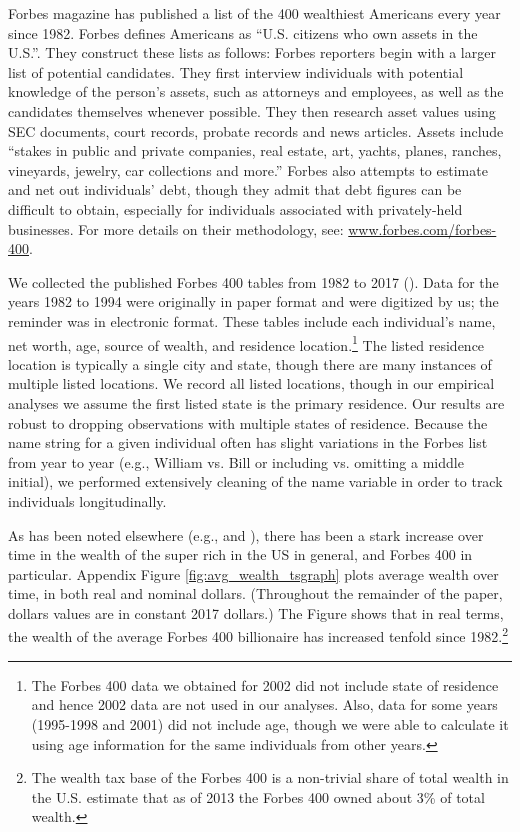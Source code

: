 \documentclass[12pt]{article}
\begin{document}
Forbes magazine has published a list of the 400 wealthiest Americans every year since 1982.  Forbes defines Americans as ``U.S. citizens who own assets in the U.S.''.  They construct these lists as follows:  Forbes reporters begin with a larger list of potential candidates. They first interview individuals with potential knowledge of the person's assets, such as attorneys and employees, as well as the candidates themselves whenever possible.
They then research asset values using SEC documents, court records, probate records and news articles. Assets include ``stakes in public and private companies, real estate, art, yachts, planes, ranches, vineyards, jewelry, car collections and more.'' Forbes also attempts to estimate and net out individuals' debt, though they admit that debt figures can be difficult to obtain, especially for individuals associated with privately-held businesses.  For more details on their methodology, see: \url{www.forbes.com/forbes-400}.

We collected  the published Forbes 400 tables from 1982 to 2017 (\cite{forbes}). Data for the years 1982 to 1994 were originally in paper format and were digitized by us; the reminder was in electronic format.  
These tables include each individual's name, net worth, age, source of wealth, and residence location.\footnote{The Forbes 400 data we obtained for 2002 did not include state of residence and hence 2002 data are not used in our analyses. Also, data for some years (1995-1998 and 2001) did not include age, though we were able to calculate it using age information for the same individuals from other years.} The listed residence location is typically a single city and state, though there are many instances of multiple listed locations. We record all listed locations, though in our empirical analyses we assume the first listed state is the primary residence. Our results are robust to dropping observations with multiple states of residence. Because the name string for a given individual often has slight variations in the Forbes list from year to year (e.g., William vs. Bill or including vs. omitting a middle initial), we performed extensively cleaning of the name variable in order to track individuals longitudinally.


As has been noted elsewhere (e.g., \cite{saez2016wealth} and \cite{smith2019}), there has been a stark increase over time in the wealth of the super rich in the US in general, and Forbes 400 in particular. Appendix Figure \ref{fig:avg_wealth_tsgraph} plots average wealth over time, in both real and nominal dollars. (Throughout the remainder of the paper, dollars values are in constant 2017 dollars.) 
The Figure shows that in real terms, the wealth of the average Forbes 400 billionaire has increased tenfold since 1982.\footnote{The wealth tax base of the Forbes 400 is a non-trivial share of total wealth in the U.S. \cite{saez2016wealth}  estimate that as of 2013 the Forbes 400 owned about 3\% of total wealth.}
\end{document}
